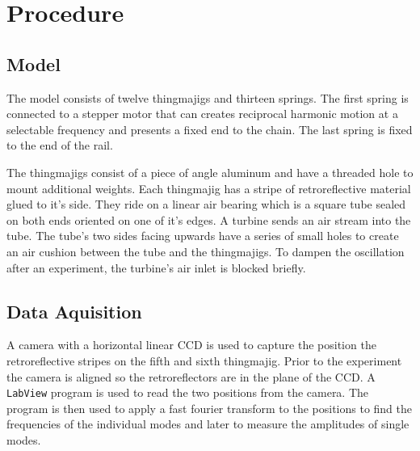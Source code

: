 \chapter{Procedure}
\section{Model}
The model consists of twelve thingmajigs and thirteen springs.
The first spring is connected to a stepper motor that can creates reciprocal harmonic motion at a selectable frequency and presents a fixed end to the chain.
The last spring is fixed to the end of the rail.

The thingmajigs consist of a piece of angle aluminum and have a threaded hole to mount additional weights.
Each thingmajig has a stripe of retroreflective material glued to it's side.
They ride on a linear air bearing which is a square tube sealed on both ends oriented on one of it's edges.
A turbine sends an air stream into the tube.
The tube's two sides facing upwards have a series of small holes to create an air cushion between the tube and the thingmajigs.
To dampen the oscillation after an experiment, the turbine's air inlet is blocked briefly.

\section{Data Aquisition}
A camera with a horizontal linear CCD is used to capture the position the retroreflective stripes on the fifth and sixth thingmajig.
Prior to the experiment the camera is aligned so the retroreflectors are in the plane of the CCD.
A \texttt{LabView} program is used to read the two positions from the camera.
The program is then used to apply a fast fourier transform to the positions to find the frequencies of the individual modes and later to measure the amplitudes of single modes.
